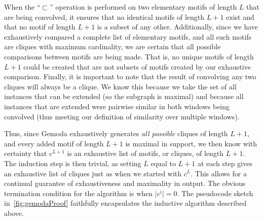     When the ``$\sqsubset$'' operation is performed on two elementary
    motifs of length $L$ that are being convolved,
    it ensures that no identical
    motifs of length $L+1$ exist and that no motif of
    length $L+1$ is a subset of any other.  Additionally, since we have
    exhaustively compared a complete list of elementary motifs, and all such
    motifs are cliques with maximum cardinality, we are certain
    that all possible comparisons between motifs are being made.  That
    is, no unique motifs of length $L+1$ could be created that are
    not subsets of motifs created by our exhaustive comparison.
    Finally, it is important to note that the result of convolving
    any two cliques will always be a clique.  We know this because
    we take the set of all instances that can be extended (so
    the subgraph is maximal) and because all instances that are
    extended were pairwise similar in both windows being convolved
    (thus meeting our definition of similarity over multiple windows).

    Thus, since Gemoda exhaustively generates \emph{all possible}
    cliques of length $L+1$,
    and every added motif of length $L+1$ is maximal in support,
    we then know with certainty that $c^{L+1}$ is an exhaustive list
    of motifs, or cliques, of length $L+1$.  The induction step
    is then trivial, as setting $L$ equal to $L+1$ at each step
    gives an exhaustive list of cliques just as when we started
    with $c^L$.  This allows for a
    continual guarantee of exhaustiveness and maximality in output.
    The obvious termination condition for the algorithm is when $\vert c^i
    \vert = 0$.  The pseudocode sketch in~\vref{fig:gemodaProof} faithfully encapsulates
    the inductive algorithm described above.


